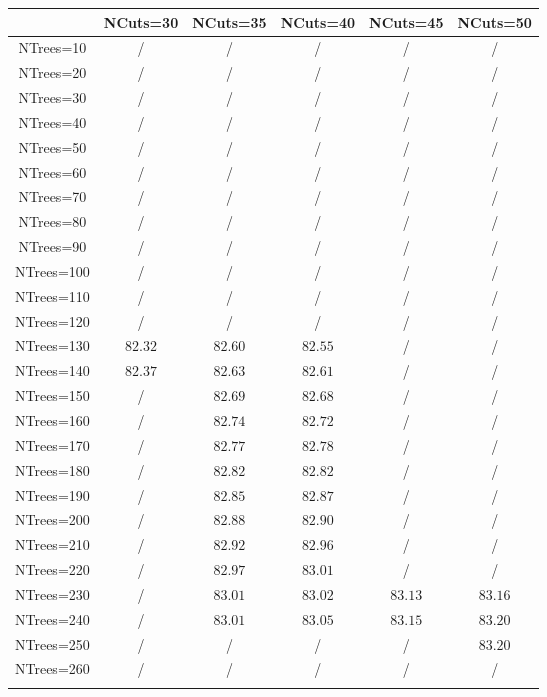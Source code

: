 \centering
\begin{tabular}{cccccc} \toprule\toprule
 & NCuts=30 & NCuts=35 & NCuts=40 & NCuts=45 & NCuts=50\\\midrule
NTrees=10 &  / &  / &  / &  / &  /\\
NTrees=20 &  / &  / &  / &  / &  /\\
NTrees=30 &  / &  / &  / &  / &  /\\
NTrees=40 &  / &  / &  / &  / &  /\\
NTrees=50 &  / &  / &  / &  / &  /\\
NTrees=60 &  / &  / &  / &  / &  /\\
NTrees=70 &  / &  / &  / &  / &  /\\
NTrees=80 &  / &  / &  / &  / &  /\\
NTrees=90 &  / &  / &  / &  / &  /\\
NTrees=100 &  / &  / &  / &  / &  /\\
NTrees=110 &  / &  / &  / &  / &  /\\
NTrees=120 &  / &  / &  / &  / &  /\\
NTrees=130 & $82.32$ & $82.60$ & $82.55$ &  / &  /\\
NTrees=140 & $82.37$ & $82.63$ & $82.61$ &  / &  /\\
NTrees=150 &  / & $82.69$ & $82.68$ &  / &  /\\
NTrees=160 &  / & $82.74$ & $82.72$ &  / &  /\\
NTrees=170 &  / & $82.77$ & $82.78$ &  / &  /\\
NTrees=180 &  / & $82.82$ & $82.82$ &  / &  /\\
NTrees=190 &  / & $82.85$ & $82.87$ &  / &  /\\
NTrees=200 &  / & $82.88$ & $82.90$ &  / &  /\\
NTrees=210 &  / & $82.92$ & $82.96$ &  / &  /\\
NTrees=220 &  / & $82.97$ & $83.01$ &  / &  /\\
NTrees=230 &  / & $83.01$ & $83.02$ & $83.13$ & $83.16$\\
NTrees=240 &  / & $83.01$ & $83.05$ & $83.15$ & $83.20$\\
NTrees=250 &  / &  / &  / &  / & $83.20$\\
NTrees=260 &  / &  / &  / &  / &  /\\
\bottomrule\bottomrule\\
\end{tabular}
